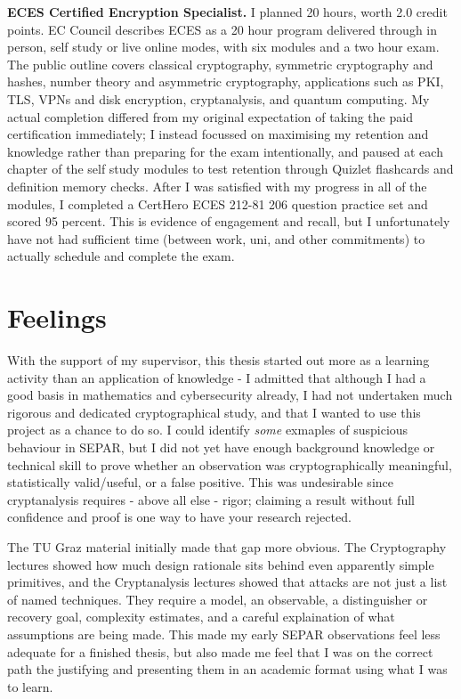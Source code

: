 \documentclass[11pt]{article}
\begin{document}
\textbf{ECES Certified Encryption Specialist.} I planned 20 hours, worth 2.0 credit points. EC Council describes ECES as a 20 hour program delivered through in person, self study or live online modes, with six modules and a two hour exam. The public outline covers classical cryptography, symmetric cryptography and hashes, number theory and asymmetric cryptography, applications such as PKI, TLS, VPNs and disk encryption, cryptanalysis, and quantum computing. My actual completion differed from my original expectation of taking the paid certification immediately; I instead focussed on maximising my retention and knowledge rather than preparing for the exam intentionally, and paused at each chapter of the self study modules to test retention through Quizlet flashcards and definition memory checks. After I was satisfied with my progress in all of the modules, I completed a CertHero ECES 212-81 206 question practice set and scored 95 percent. This is evidence of engagement and recall, but I unfortunately have not had sufficient time (between work, uni, and other commitments) to actually schedule and complete the exam.


\section*{Feelings}

With the support of my supervisor, this thesis started out more as a learning activity than an application of knowledge - I admitted that although I had a good basis in mathematics and cybersecurity already, I had not undertaken much rigorous and dedicated cryptographical study, and that I wanted to use this project as a chance to do so. I could identify \textit{some} exmaples of suspicious behaviour in SEPAR, but I did not yet have enough background knowledge or technical skill to prove whether an observation was cryptographically meaningful, statistically valid/useful, or a false positive. This was undesirable since cryptanalysis requires - above all else - rigor; claiming a result without full confidence and proof is one way to have your research rejected.

The TU Graz material initially made that gap more obvious. The Cryptography lectures showed how much design rationale sits behind even apparently simple primitives, and the Cryptanalysis lectures showed that attacks are not just a list of named techniques. They require a model, an observable, a distinguisher or recovery goal, complexity estimates, and a careful explaination of what assumptions are being made. This made my early SEPAR observations feel less adequate for a finished thesis, but also made me feel that I was on the correct path the justifying and presenting them in an academic format using what I was to learn.
\end{document}
